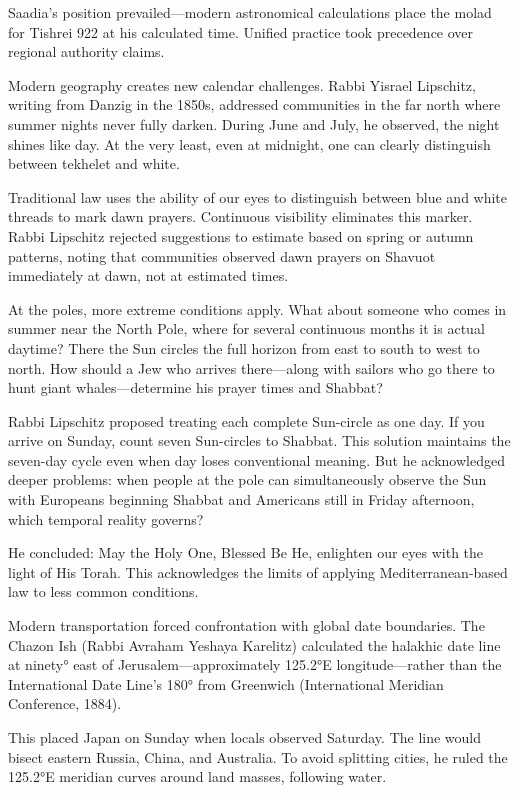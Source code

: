 Saadia's position prevailed—modern astronomical calculations place the molad for Tishrei 922 at his calculated time. Unified practice took precedence over regional authority claims.

Modern geography creates new calendar challenges. Rabbi Yisrael Lipschitz, writing from Danzig in the 1850s, addressed communities in the far north where summer nights never fully darken. \QENOpen{}During June and July,\QENClose{} he observed, \QENOpen{}the night shines like day. At the very least, even at midnight, one can clearly distinguish between tekhelet and white.\QENClose{} 

Traditional law uses the ability of our eyes to distinguish between blue and white threads to mark dawn prayers. Continuous visibility eliminates this marker. Rabbi Lipschitz rejected suggestions to estimate based on spring or autumn patterns, noting that communities observed dawn prayers on Shavuot \QSOpen{}immediately at dawn,\QSClose{} not at estimated times.

At the poles, more extreme conditions apply. \QENOpen{}What about someone who comes in summer near the North Pole, where for several continuous months it is actual daytime? There the Sun circles the full horizon from east to south to west to north. How should a Jew who arrives there—along with sailors who go there to hunt giant whales—determine his prayer times and Shabbat?\QENClose{}

Rabbi Lipschitz proposed treating each complete Sun-circle as one day. If you arrive on Sunday, count seven Sun-circles to Shabbat. This solution maintains the seven-day cycle even when \QSOpen{}day\QSClose{} loses conventional meaning. But he acknowledged deeper problems: when people at the pole can simultaneously observe the Sun with Europeans beginning Shabbat and Americans still in Friday afternoon, which temporal reality governs?

He concluded: \QENOpen{}May the Holy One, Blessed Be He, enlighten our eyes with the light of His Torah.\QENClose{} This acknowledges the limits of applying Mediterranean-based law to less common conditions.

Modern transportation forced confrontation with global date boundaries. The Chazon Ish (Rabbi Avraham Yeshaya Karelitz) calculated the halakhic date line at ninety° east of Jerusalem—approximately 125.2°E longitude—rather than the International Date Line's 180° from Greenwich (International Meridian Conference, 1884).

This placed Japan on Sunday when locals observed Saturday. The line would bisect eastern Russia, China, and Australia. To avoid splitting cities, he ruled the 125.2°E meridian curves around land masses, following water.

